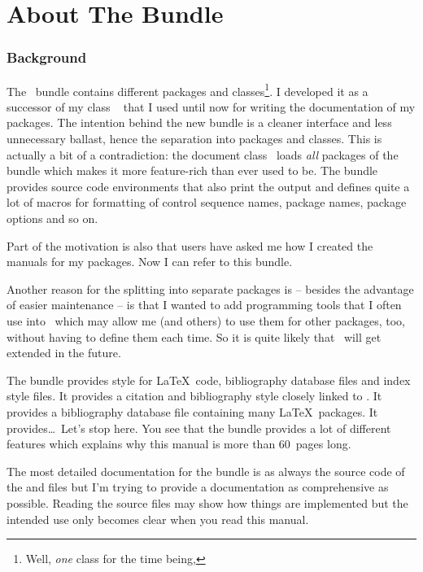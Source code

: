 \documentclass[load-preamble+]{cnltx-doc}
\newcommand*\file[1]{\code{#1}}
\begin{document}
\part{About The Bundle}

\section{Background}

The \cnltx\ bundle contains different packages and classes\footnote{Well,
  \emph{one} class for the time being,}.  I developed it as a successor of my
class ~\cite{cls:cnpkgdoc} that I used until now for writing the
documentation of my packages.  The intention behind the new bundle is a
cleaner interface and less unnecessary ballast, hence the separation into
packages and classes.  This is actually a bit of a contradiction: the document
class \cnltxdoc\ loads \emph{all} packages of the bundle which makes it more
feature-rich than  ever used to be.  The bundle provides source
code environments that also print the output and defines quite a lot of macros
for formatting of control sequence names, package names, package options and
so on.

Part of the motivation is also that users have asked me how I created the
manuals for my packages.  Now I can refer to this bundle.

Another reason for the splitting into separate packages is -- besides the
advantage of easier maintenance -- is that I wanted to add programming tools
that I often use into \cnltxbase\ which may allow me (and others) to use them
for other packages, too, without having to define them each time.  So it is
quite likely that \cnltxbase\ will get extended in the future.

The bundle provides  style for \LaTeX\ code, bibliography
database files and index style files.  It provides a  citation
and bibliography style closely linked to \cnltxdoc.  It provides a
bibliography database file containing many \LaTeX\ packages.  It
provides\ldots\ Let's stop here.  You see that the bundle provides a lot of
different features which explains why this manual is more than 60~pages long.

The most detailed documentation for the bundle is as always the source code of
the \file{sty} and \file{cls} files but I'm trying to provide a documentation
as comprehensive as possible.  Reading the source files may show how things
are implemented but the intended use only becomes clear when you read this
manual.
\end{document}
